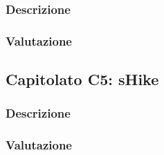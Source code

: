 \subsubsection{Descrizione}

\subsubsection{Valutazione}



\subsection{Capitolato C5: sHike}

\subsubsection{Descrizione}

\subsubsection{Valutazione}